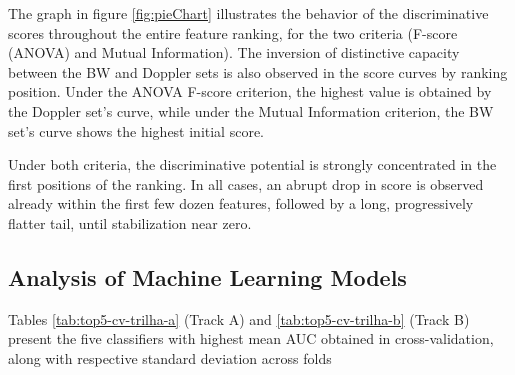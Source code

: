 \documentclass[12pt,a4paper]{article}
\begin{document}
The graph in figure \ref{fig:pieChart} illustrates the behavior of the discriminative scores throughout the entire feature ranking, for the two criteria (F-score (ANOVA) and Mutual Information). The inversion of distinctive capacity between the BW and Doppler sets is also observed in the score curves by ranking position. Under the ANOVA F-score criterion, the highest value is obtained by the Doppler set's curve, while under the Mutual Information criterion, the BW set's curve shows the highest initial score.

Under both criteria, the discriminative potential is strongly concentrated in the first positions of the ranking. In all cases, an abrupt drop in score is observed already within the first few dozen features, followed by a long, progressively flatter tail, until stabilization near zero.


\subsection{Analysis of Machine Learning Models}

Tables \ref{tab:top5-cv-trilha-a} (Track A) and \ref{tab:top5-cv-trilha-b} (Track B) present the five classifiers with highest mean AUC obtained in cross-validation, along with respective standard deviation across folds
\end{document}

